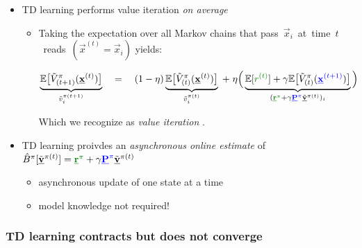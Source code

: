 \begin{frame}\frametitle{\subsubsecname}

\begin{itemize}
	\item TD learning performs value iteration \emph{on average}
		\vspace{1mm}
		
		\begin{itemize}
			\item Taking the expectation over all Markov chains 
			that pass~$\vec x_i$~at~time~$t$~reads~$(\vec x^{(t)} = \vec x_i)$ yields:
			
			\begin{equation}
		\underbrace{\E\big\lbrack\tilde V^\pi_{(t+1)}(\vec x^{(t)})\big\rbrack
			}_{\tilde v_i^{\pi(t+1)}}
		\quad=\quad 
		(1 - \lr)\underbrace{\E\big\lbrack \tilde V^\pi_{(t)}(\vec x^{(t)}) \big\rbrack
			}_{\tilde v_i^{\pi(t)}}
		\;+\; \lr \Big( \underbrace{\E\lbrack{\color{reward} r^{(t)}}\rbrack
		+ \gamma \E\big\lbrack\tilde V^\pi_{(t)}({\color{trans}\vec x^{(t+1)}})\big\rbrack
		}_{({\color{reward} \vec r^\pi} 
			+ \gamma {\color{trans} \vec P^\pi} \tilde{\vec v}^{\pi(t)})_i}\Big)
			\end{equation}
			
		Which we recognize as \emph{value iteration} .
			
		\end{itemize}
	
	
	\vspace{2mm}
	\item TD learning proivdes an {\em asynchronous online estimate} of 
			$\hat B^\pi[\tilde{\vec v}^{\pi(t)}] = {\color{reward}\vec r^\pi} 
			+ \gamma {\color{trans}\vec P^\pi} \tilde{\vec v}^{\pi(t)}$
		\vspace{1mm}
		\begin{itemize}
			\item asynchronous update of one state at a time
					\vspace{1mm}
			\item model knowledge not required!
		\end{itemize}

	\end{itemize}

\end{frame}

\subsubsection{TD learning contracts but does not converge}

